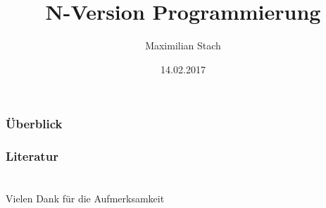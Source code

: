 \documentclass{beamer}
\title[N-Version Programmierung]{N-Version Programmierung} %
\author{Maximilian Stach} %
\institute[TU Dortmund] %
{
Technische Universität Dortmund \\ %
\medskip
}
\date{14.02.2017} %
\begin{document}
\begin{frame}
\titlepage %
\end{frame}

\begin{frame}
\frametitle{Überblick} %
\tableofcontents %
\end{frame}






%

\begin{frame}[allowframebreaks]
	\frametitle{Literatur}
	
	
\end{frame}


\section{}
\begin{frame}
	\begin{center}
		\huge{Vielen Dank für die Aufmerksamkeit}
	\end{center}
	

\end{frame}
\end{document}

